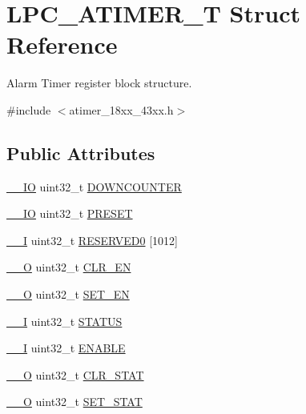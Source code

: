\hypertarget{struct_l_p_c___a_t_i_m_e_r___t}{}\section{L\+P\+C\+\_\+\+A\+T\+I\+M\+E\+R\+\_\+T Struct Reference}
\label{struct_l_p_c___a_t_i_m_e_r___t}


Alarm Timer register block structure.  




{\ttfamily \#include $<$atimer\+\_\+18xx\+\_\+43xx.\+h$>$}

\subsection*{Public Attributes}
\begin{DoxyCompactItemize}
\item 
\hyperlink{core__sc300_8h_aec43007d9998a0a0e01faede4133d6be}{\+\_\+\+\_\+\+IO} uint32\+\_\+t \hyperlink{struct_l_p_c___a_t_i_m_e_r___t_ab2ea775cfcec21eb71f15db36156fd26}{D\+O\+W\+N\+C\+O\+U\+N\+T\+ER}
\item 
\hyperlink{core__sc300_8h_aec43007d9998a0a0e01faede4133d6be}{\+\_\+\+\_\+\+IO} uint32\+\_\+t \hyperlink{struct_l_p_c___a_t_i_m_e_r___t_a2940982cef9c8d56fa9a4b6c54fd1795}{P\+R\+E\+S\+ET}
\item 
\hyperlink{core__sc300_8h_af63697ed9952cc71e1225efe205f6cd3}{\+\_\+\+\_\+I} uint32\+\_\+t \hyperlink{struct_l_p_c___a_t_i_m_e_r___t_ac50acdf4aa719337f026cb62cb90d44b}{R\+E\+S\+E\+R\+V\+E\+D0} \mbox{[}1012\mbox{]}
\item 
\hyperlink{core__sc300_8h_a7e25d9380f9ef903923964322e71f2f6}{\+\_\+\+\_\+O} uint32\+\_\+t \hyperlink{struct_l_p_c___a_t_i_m_e_r___t_a0c63291e63fedf8b332bf13806dcc1be}{C\+L\+R\+\_\+\+EN}
\item 
\hyperlink{core__sc300_8h_a7e25d9380f9ef903923964322e71f2f6}{\+\_\+\+\_\+O} uint32\+\_\+t \hyperlink{struct_l_p_c___a_t_i_m_e_r___t_a53431ee1ced472ce8016f1993e94b104}{S\+E\+T\+\_\+\+EN}
\item 
\hyperlink{core__sc300_8h_af63697ed9952cc71e1225efe205f6cd3}{\+\_\+\+\_\+I} uint32\+\_\+t \hyperlink{struct_l_p_c___a_t_i_m_e_r___t_a11836e2d7e9004b04fd7a3be8990fb73}{S\+T\+A\+T\+US}
\item 
\hyperlink{core__sc300_8h_af63697ed9952cc71e1225efe205f6cd3}{\+\_\+\+\_\+I} uint32\+\_\+t \hyperlink{struct_l_p_c___a_t_i_m_e_r___t_a1db7267663cd5a0ddbd92c7017edcd2d}{E\+N\+A\+B\+LE}
\item 
\hyperlink{core__sc300_8h_a7e25d9380f9ef903923964322e71f2f6}{\+\_\+\+\_\+O} uint32\+\_\+t \hyperlink{struct_l_p_c___a_t_i_m_e_r___t_ac4386dfa2c7f25e393de9f146cce210f}{C\+L\+R\+\_\+\+S\+T\+AT}
\item 
\hyperlink{core__sc300_8h_a7e25d9380f9ef903923964322e71f2f6}{\+\_\+\+\_\+O} uint32\+\_\+t \hyperlink{struct_l_p_c___a_t_i_m_e_r___t_a496d53e8e6ff2ee21f08495c81cffac1}{S\+E\+T\+\_\+\+S\+T\+AT}
\end{DoxyCompactItemize}


